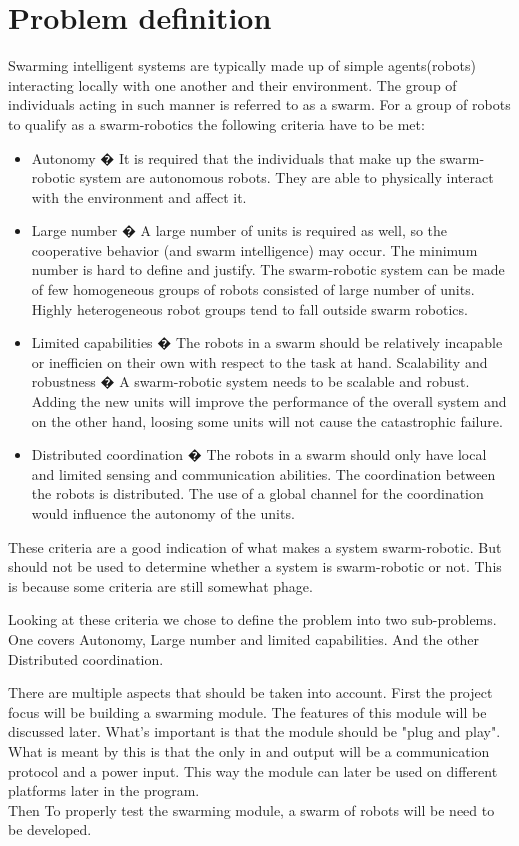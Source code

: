 \section{Problem definition}
Swarming intelligent systems are typically made up of simple agents(robots) interacting locally with one another and their environment. The group of individuals acting in such manner is referred to as a swarm\cite{swarmintelligence}. For a group of robots to qualify as a swarm-robotics the following criteria have to be met:

\begin{itemize}
	\item Autonomy � It is required that the individuals that make up 	the swarm-robotic system are autonomous robots. They are able to 		physically 		interact with the environment and affect it.
	\item Large number � A large number of units is required
	as well, so the cooperative behavior (and
	swarm intelligence) may occur. The minimum number
	is hard to define and justify. The swarm-robotic
	system can be made of few homogeneous groups of
	robots consisted of large number of units. Highly heterogeneous
	robot groups tend to fall outside swarm
	robotics.
	\item Limited capabilities � The robots in a swarm
	should be relatively incapable or inefficien on their
	own with respect to the task at hand.
	Scalability and robustness � A swarm-robotic
	system needs to be scalable and robust. Adding the
	new units will improve the performance of the overall
	system and on the other hand, loosing some units will
	not cause the catastrophic failure.
	\item Distributed coordination � The robots in a swarm
	should only have local and limited sensing and communication
	abilities. The coordination between the
	robots is distributed. The use of a global channel for
	the coordination would influence the autonomy of the
	units.
\end{itemize}

These criteria are a good indication of what makes a system swarm-robotic. But should not be used to determine whether a system is swarm-robotic or not. This is because some criteria are still somewhat phage\cite{swarmintelligence}.

Looking at these criteria we chose to define the problem into two sub-problems. One covers Autonomy, Large number and limited capabilities. And the other Distributed coordination.

There are multiple aspects that should be taken into account. First the project focus will be building a swarming module. The features of this module will be discussed later. What's important is that the module should be "plug and play". What is meant by this is that the only in and output will be a communication protocol and a power input. This way the module can later be used on different platforms later in the program.\\ Then To properly test the swarming module, a swarm of robots will be need to be developed.

